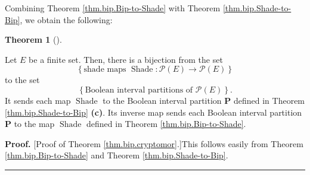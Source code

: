 \documentclass[numbers=enddot,12pt,final,onecolumn]{scrartcl}%
\theoremstyle{definition}
\newtheorem{theo}{Theorem}[section]
\newenvironment{theorem}[1][]
{\begin{theo}[#1]\begin{leftbar}}
{\end{leftbar}\end{theo}}
\newenvironment{proof}[1][Proof]{\noindent\textbf{#1.} }{\ \rule{0.5em}{0.5em}}
\newenvironment{vershort}{}{}
\begin{document}
Combining Theorem \ref{thm.bip.Bip-to-Shade} with Theorem
\ref{thm.bip.Shade-to-Bip}, we obtain the following:

\begin{theorem}
\label{thm.bip.cryptomor}Let $E$ be a finite set. Then, there is a bijection
from the set%
\[
\left\{  \text{shade maps }\operatorname*{Shade}:\mathcal{P}\left(  E\right)
\rightarrow\mathcal{P}\left(  E\right)  \right\}
\]
to the set%
\[
\left\{  \text{Boolean interval partitions of }\mathcal{P}\left(  E\right)
\right\}  .
\]
It sends each map $\operatorname*{Shade}$ to the Boolean interval partition
$\mathbf{P}$ defined in Theorem \ref{thm.bip.Shade-to-Bip}\textbf{ (c)}. Its
inverse map sends each Boolean interval partition $\mathbf{P}$ to the map
$\operatorname*{Shade}$ defined in Theorem \ref{thm.bip.Bip-to-Shade}.
\end{theorem}

\begin{vershort}
\begin{proof}
[Proof of Theorem \ref{thm.bip.cryptomor}.]This follows easily from Theorem
\ref{thm.bip.Bip-to-Shade} and Theorem \ref{thm.bip.Shade-to-Bip}.
\end{proof}
\end{vershort}
\end{document}
